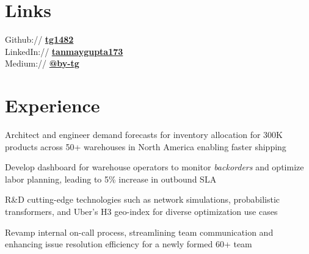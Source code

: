 \documentclass[]{deedy-resume-openfont}
\begin{document}
\begin{minipage}[t]{0.28\textwidth}
\section{Links} 
Github:// \href{https://github.com/tg1482}{\bf tg1482} \\
LinkedIn://  \href{https://www.linkedin.com/in/tanmaygupta173}{\bf tanmaygupta173} \\
Medium:// \href{https://medium.com/@by-tg}{\bf @by-tg} \\


%
%

\end{minipage} 
\hfill
\begin{minipage}[t]{0.66\textwidth} 


\section{Experience}

\vspace{\topsep} %
\begin{tightemize}
\item Architect and engineer demand forecasts for inventory allocation for 300K products across 50+ warehouses in North America enabling faster shipping
\item Develop dashboard for warehouse operators to monitor \textit{backorders} and optimize labor planning, leading to 5\% increase in outbound SLA
\item R\&D cutting-edge technologies such as network simulations, probabilistic transformers, and Uber's H3 geo-index for diverse optimization use cases
\item Revamp internal on-call process, streamlining team communication and enhancing issue resolution efficiency for a newly formed 60+ team

\end{tightemize}
\sectionsep


\end{minipage}
\end{document}
